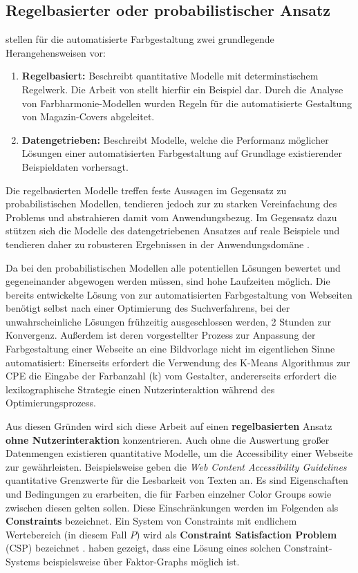 \documentclass[11pt,a4paper,bibliography=totoc,twocolumn]{scrartcl}
\begin{document}
\subsection{Regelbasierter oder probabilistischer Ansatz}

\citet{webpage} stellen für die automatisierte Farbgestaltung zwei grundlegende Herangehensweisen vor:

\begin{enumerate}
	\item \textbf{Regelbasiert:} Beschreibt quantitative Modelle mit determinstischem Regelwerk. Die Arbeit von \citet{magazines} stellt hierfür ein Beispiel dar. Durch die Analyse von Farbharmonie-Modellen wurden Regeln für die automatisierte Gestaltung von Magazin-Covers abgeleitet.
	\item \textbf{Datengetrieben:} Beschreibt Modelle, welche die Performanz möglicher Lösungen einer automatisierten Farbgestaltung auf Grundlage existierender Beispieldaten vorhersagt.
\end{enumerate}

Die regelbasierten Modelle treffen feste Aussagen im Gegensatz zu probabilistischen Modellen, tendieren jedoch zur zu starken Vereinfachung des Problems und abstrahieren damit vom Anwendungsbezug. Im Gegensatz dazu stützen sich die Modelle des datengetriebenen Ansatzes auf reale Beispiele und tendieren daher zu robusteren Ergebnissen in der Anwendungsdomäne \citep{webpage}.

Da bei den probabilistischen Modellen alle potentiellen Lösungen bewertet und gegeneinander abgewogen werden müssen, sind hohe Laufzeiten möglich. Die bereits entwickelte Lösung von \citet{webpage} zur automatisierten Farbgestaltung von Webseiten benötigt selbst nach einer Optimierung des Suchverfahrens, bei der unwahrscheinliche Lösungen frühzeitig ausgeschlossen werden, 2 Stunden zur Konvergenz. Außerdem ist deren vorgestellter Prozess zur Anpassung der Farbgestaltung einer Webseite an eine Bildvorlage nicht im eigentlichen Sinne automatisiert: Einerseits erfordert die Verwendung des K-Means Algorithmus zur CPE die Eingabe der Farbanzahl (k) vom Gestalter, andererseits erfordert die lexikographische Strategie einen Nutzerinteraktion während des Optimierungsprozess.

Aus diesen Gründen wird sich diese Arbeit auf einen \textbf{regelbasierten} Ansatz \textbf{ohne Nutzerinteraktion} konzentrieren. Auch ohne die Auswertung großer Datenmengen existieren quantitative Modelle, um die Accessibility einer Webseite zur gewährleisten. Beispielsweise geben die \emph{Web Content Accessibility Guidelines} \citep{wcag} quantitative Grenzwerte für die Lesbarkeit von Texten an. Es sind Eigenschaften und Bedingungen zu erarbeiten, die für Farben einzelner Color Groups sowie zwischen diesen gelten sollen. Diese Einschränkungen werden im Folgenden als \textbf{Constraints} bezeichnet. Ein System von Constraints mit endlichem Wertebereich (in diesem Fall $P$) wird als \textbf{Constraint Satisfaction Problem} (CSP) bezeichnet \citep{constraint-programmierung}. \citet{magazines} haben gezeigt, dass eine Lösung eines solchen Constraint-Systems beispielsweise über Faktor-Graphs möglich ist.
\end{document}

